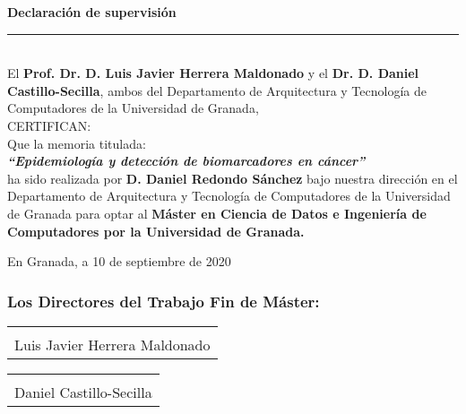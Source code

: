 \documentclass[a4paper, 12pt]{book}
\makeatletter
\newcommand{\signatureline}[2]{%
	\par\noindent
	\begin{tabular}{@{}p{6cm}@{}}
		\rule{0pt}{4cm}
		\\ \hline \\[-.75\normalbaselineskip]
		#1
	\end{tabular}\hfill
	\begin{tabular}{@{}p{6cm}@{}}
		\rule{0pt}{4cm}
		\\ \hline \\[-.75\normalbaselineskip]
		#2
	\end{tabular}\par
}
\newcommand{\approval}{%
	\par\vspace*{\fill} %
	\subsubsection*{Los Directores del Trabajo Fin de Máster:}
	\signatureline{Luis Javier Herrera Maldonado}{Daniel Castillo-Secilla} %
	\clearpage
}
\makeatother
\begin{document}
    \thispagestyle{empty}
	\newpage

{ \huge \bfseries Declaración de supervisión}\\
\rule{\linewidth}{0.2 mm} \\[0.5 cm]

El \textbf{Prof. Dr. D. Luis Javier Herrera Maldonado} y el \textbf{Dr. D. Daniel Castillo-Secilla}, ambos del Departamento de Arquitectura y Tecnología de Computadores de la Universidad de Granada,
\\[0,25 cm]
CERTIFICAN:
\\[0,25 cm]
Que la memoria titulada:
\\[0,25 cm]
\textbf{\textit{\large``Epidemiología y detección de biomarcadores en cáncer''}}
\\[0,2 cm]
ha sido realizada por \textbf{D. Daniel Redondo Sánchez} bajo nuestra dirección en el Departamento de Arquitectura y Tecnología de Computadores de la Universidad de Granada para optar al \textbf{Máster en Ciencia de Datos e Ingeniería de Computadores por la Universidad de Granada.}
\\[1 cm]
\begin{center}
	En Granada, a 10 de septiembre de 2020
	\\[2 cm]
	\approval
\end{center}
	
	
	
\end{document}

